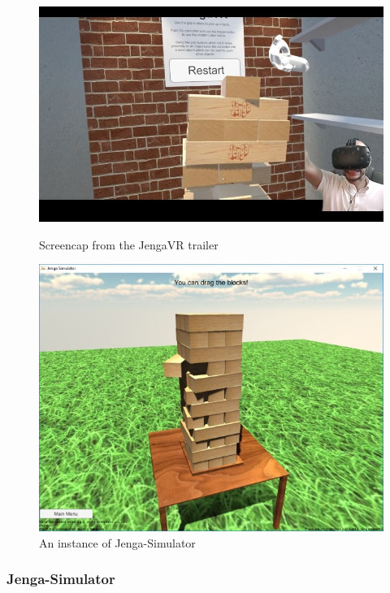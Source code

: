 \begin{figure}[ht]
    \begin{minipage}{0.45\textwidth}
        \centering
        \includegraphics[width=.9\linewidth]{images/litreview/jenga-3}
        \caption{Screencap from the JengaVR trailer \protect\citep{github-Physijs}}
        \label{fig:simulator3}
    \end{minipage}\hfill
    \begin{minipage}{0.45\textwidth}
        \centering
        \includegraphics[width=.9\linewidth]{images/litreview/jenga-4}
        \caption{An instance of Jenga-Simulator \protect\citep{gamejoltjengasim}}
        \label{fig:simulator4}
    \end{minipage}
\end{figure}

\subsubsection{\protect{} Jenga-Simulator}

